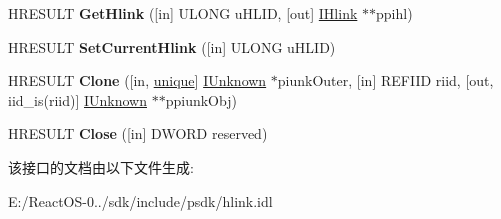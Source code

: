 \begin{DoxyCompactItemize}
H\+R\+E\+S\+U\+LT {\bfseries Get\+Hlink} (\mbox{[}in\mbox{]} U\+L\+O\+NG u\+H\+L\+ID, \mbox{[}out\mbox{]} \hyperlink{interface_i_hlink}{I\+Hlink} $\ast$$\ast$ppihl)
\item 
\mbox{\label{interface_i_hlink_browse_context_abd26c2a1b7f4bd4ff3bc1743728667c5}} 
H\+R\+E\+S\+U\+LT {\bfseries Set\+Current\+Hlink} (\mbox{[}in\mbox{]} U\+L\+O\+NG u\+H\+L\+ID)
\item 
\mbox{\label{interface_i_hlink_browse_context_a9f5f97a3c4e966f87eb1c1bef3db456f}} 
H\+R\+E\+S\+U\+LT {\bfseries Clone} (\mbox{[}in, \hyperlink{interfaceunique}{unique}\mbox{]} \hyperlink{interface_i_unknown}{I\+Unknown} $\ast$piunk\+Outer, \mbox{[}in\mbox{]} R\+E\+F\+I\+ID riid, \mbox{[}out, iid\+\_\+is(riid)\mbox{]} \hyperlink{interface_i_unknown}{I\+Unknown} $\ast$$\ast$ppiunk\+Obj)
\item 
\mbox{\label{interface_i_hlink_browse_context_ae70c109b4c3d47ab6510daf37f6cd327}} 
H\+R\+E\+S\+U\+LT {\bfseries Close} (\mbox{[}in\mbox{]} D\+W\+O\+RD reserved)
\end{DoxyCompactItemize}


该接口的文档由以下文件生成\+:\begin{DoxyCompactItemize}
\item 
E\+:/\+React\+O\+S-\/0../sdk/include/psdk/hlink.\+idl\end{DoxyCompactItemize}
